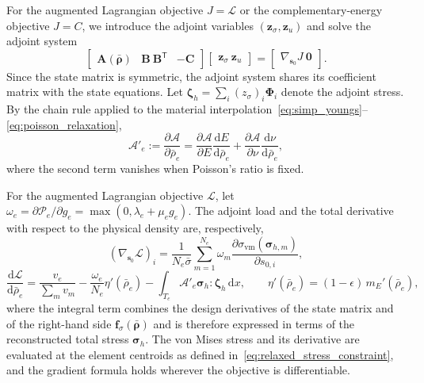 For the augmented Lagrangian objective $J = \mathcal{L}$ or the complementary-energy objective $J = C$, we introduce the adjoint variables $(\boldsymbol{z}_\sigma, \boldsymbol{z}_u)$ and solve the adjoint system
\begin{equation}
\label{eq:adjoint_system}
\begin{bmatrix} \boldsymbol{A}(\bar{\boldsymbol{\rho}}) & \boldsymbol{B} \ \boldsymbol{B}^{\mathsf T} & -\boldsymbol{C} \end{bmatrix}
\begin{bmatrix} \boldsymbol{z}_\sigma \ \boldsymbol{z}_u \end{bmatrix}
= \begin{bmatrix} \nabla_{\boldsymbol{s}_0} J \ \boldsymbol{0} \end{bmatrix}.
\end{equation}
Since the state matrix is symmetric, the adjoint system shares its coefficient matrix with the state equations. Let $\boldsymbol{\zeta}_h = \sum_i (z_\sigma)_i \boldsymbol{\Phi}_i$ denote the adjoint stress. By the chain rule applied to the material interpolation~\eqref{eq:simp_youngs}--\eqref{eq:poisson_relaxation},
\begin{equation*}
\mathcal{A}'_e := \frac{\partial \mathcal{A}}{\partial \bar{\rho}_e}
= \frac{\partial \mathcal{A}}{\partial E} \frac{\mathrm{d}E}{\mathrm{d}\bar{\rho}_e}
+ \frac{\partial \mathcal{A}}{\partial \nu} \frac{\mathrm{d}\nu}{\mathrm{d}\bar{\rho}_e},
\end{equation*}
where the second term vanishes when Poisson's ratio is fixed.

For the augmented Lagrangian objective $\mathcal{L}$, let $\omega_e = \partial\mathcal{P}_e/\partial g_e = \max(0, \lambda_e + \mu_e g_e)$. The adjoint load and the total derivative with respect to the physical density are, respectively,
\begin{equation*}
(\nabla_{\boldsymbol{s}_0} \mathcal{L})_i
= \frac{1}{N_e \bar{\sigma}} \sum_{m=1}^{N_e} \omega_m
\frac{\partial \sigma_{\mathrm{vm}}(\boldsymbol{\sigma}_{h,m})}{\partial s_{0,i}},
\end{equation*}
\begin{equation}
\label{eq:al_gradient}
\frac{\mathrm{d}\mathcal{L}}{\mathrm{d}\bar{\rho}_e}
= \frac{v_e}{\sum_m v_m} - \frac{\omega_e}{N_e} \eta'(\bar{\rho}_e)
- \int_{T_e} \mathcal{A}'_e \boldsymbol{\sigma}_h : \boldsymbol{\zeta}_h \,\mathrm{d}x,
\qquad \eta'(\bar{\rho}_e) = (1 - \epsilon)\, m_E'(\bar{\rho}_e),
\end{equation}
where the integral term combines the design derivatives of the state matrix and of the right-hand side $\boldsymbol{f}_\sigma(\bar{\boldsymbol{\rho}})$ and is therefore expressed in terms of the reconstructed total stress $\boldsymbol{\sigma}_h$. The von Mises stress and its derivative are evaluated at the element centroids as defined in~\eqref{eq:relaxed_stress_constraint}, and the gradient formula holds wherever the objective is differentiable.

